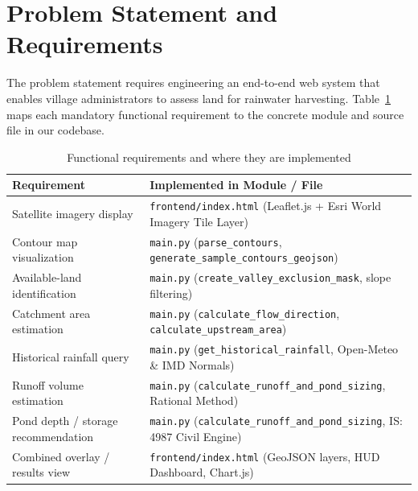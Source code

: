\documentclass[manuscript,screen,nonacm]{acmart}
\begin{document}
\section{Problem Statement and Requirements}
\label{sec:requirements}
The problem statement requires engineering an end-to-end web system that enables village administrators to assess land for rainwater harvesting. Table~\ref{tab:requirements} maps each mandatory functional requirement to the concrete module and source file in our codebase.

\begin{table}[h]
  \caption{Functional requirements and where they are implemented}
  \label{tab:requirements}
  \begin{tabular}{p{5.5cm}p{7.5cm}}
    \toprule
    Requirement & Implemented in Module / File \\
    \midrule
    Satellite imagery display & \texttt{frontend/index.html} (Leaflet.js + Esri World Imagery Tile Layer) \\
    Contour map visualization & \texttt{main.py} (\texttt{parse\_contours}, \texttt{generate\_sample\_contours\_geojson}) \\
    Available-land identification & \texttt{main.py} (\texttt{create\_valley\_exclusion\_mask}, slope filtering) \\
    Catchment area estimation & \texttt{main.py} (\texttt{calculate\_flow\_direction}, \texttt{calculate\_upstream\_area}) \\
    Historical rainfall query & \texttt{main.py} (\texttt{get\_historical\_rainfall}, Open-Meteo \& IMD Normals) \\
    Runoff volume estimation & \texttt{main.py} (\texttt{calculate\_runoff\_and\_pond\_sizing}, Rational Method) \\
    Pond depth / storage recommendation & \texttt{main.py} (\texttt{calculate\_runoff\_and\_pond\_sizing}, IS: 4987 Civil Engine) \\
    Combined overlay / results view & \texttt{frontend/index.html} (GeoJSON layers, HUD Dashboard, Chart.js) \\
    \bottomrule
  \end{tabular}
\end{table}
\end{document}
